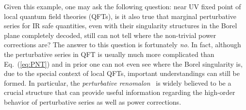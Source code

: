 \documentclass[a4paper,11pt]{article}
\begin{document}
Given this example, one may ask the following question: near UV fixed point of local quantum field theories (QFTs), is it also true that marginal perturbative series for IR safe quantities, even with their singularity structures in the Borel plane completely decoded, still can not tell where the non-trivial power corrections are?  The answer to this question is fortunately {\it no}. In fact, although the perturbative series in QFT is usually much more complicated than Eq.~(\ref{eq:PNT}) and in prior one can not even see where the Borel singularity is, due to the special context of local QFTs, important understandings can still be formed. In particular, the {\it perturbative renomalon}~\cite{tHooft:1977xjm,Parisi:1978az,Parisi:1978bj} is widely believed to be a crucial structure that can provide useful information regarding the high-order behavior of perturbative series as well as power corrections. 
\end{document}

